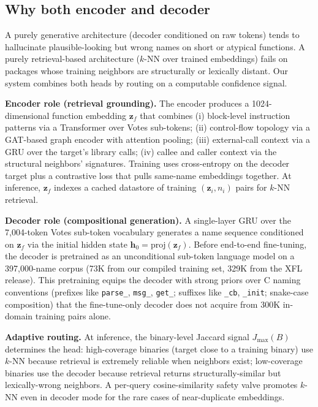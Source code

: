 \subsection{Why both encoder and decoder}
\label{sec:enc-dec-roles}

A purely generative architecture (decoder conditioned on raw tokens) tends to hallucinate plausible-looking but wrong names on short or atypical functions. A purely retrieval-based architecture ($k$-NN over trained embeddings) fails on packages whose training neighbors are structurally or lexically distant. Our system combines both heads by routing on a computable confidence signal.

\textbf{Encoder role (retrieval grounding).} The encoder produces a 1024-dimensional function embedding $\mathbf{z}_f$ that combines (i) block-level instruction patterns via a Transformer over Votes sub-tokens; (ii) control-flow topology via a GAT-based graph encoder with attention pooling; (iii) external-call context via a GRU over the target's library calls; (iv) callee and caller context via the structural neighbors' signatures. Training uses cross-entropy on the decoder target plus a contrastive loss that pulls same-name embeddings together. At inference, $\mathbf{z}_f$ indexes a cached datastore of training $(\mathbf{z}_i, n_i)$ pairs for $k$-NN retrieval.

\textbf{Decoder role (compositional generation).} A single-layer GRU over the 7{,}004-token Votes sub-token vocabulary generates a name sequence conditioned on $\mathbf{z}_f$ via the initial hidden state $\mathbf{h}_0{=}\mathrm{proj}(\mathbf{z}_f)$. Before end-to-end fine-tuning, the decoder is pretrained as an unconditional sub-token language model on a 397{,}000-name corpus (73K from our compiled training set, 329K from the XFL release). This pretraining equips the decoder with strong priors over C naming conventions (prefixes like \texttt{parse\_}, \texttt{msg\_}, \texttt{get\_}; suffixes like \texttt{\_cb}, \texttt{\_init}; snake-case composition) that the fine-tune-only decoder does not acquire from 300K in-domain training pairs alone.

\textbf{Adaptive routing.} At inference, the binary-level Jaccard signal $J_{\max}(B)$ determines the head: high-coverage binaries (target close to a training binary) use $k$-NN because retrieval is extremely reliable when neighbors exist; low-coverage binaries use the decoder because retrieval returns structurally-similar but lexically-wrong neighbors. A per-query cosine-similarity safety valve promotes $k$-NN even in decoder mode for the rare cases of near-duplicate embeddings.


